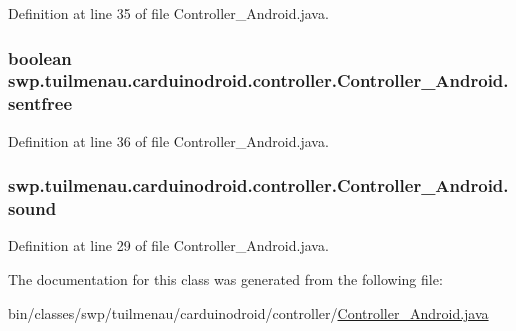 Definition at line 35 of file Controller\+\_\+\+Android.\+java.

\hypertarget{classswp_1_1tuilmenau_1_1carduinodroid_1_1controller_1_1_controller___android_a4abc4af6b59b0fdc690f69aecef0603d}{}
\subsubsection[{sentfree}]{\setlength{\rightskip}{0pt plus 5cm}boolean swp.\+tuilmenau.\+carduinodroid.\+controller.\+Controller\+\_\+\+Android.\+sentfree}\label{classswp_1_1tuilmenau_1_1carduinodroid_1_1controller_1_1_controller___android_a4abc4af6b59b0fdc690f69aecef0603d}


Definition at line 36 of file Controller\+\_\+\+Android.\+java.

\hypertarget{classswp_1_1tuilmenau_1_1carduinodroid_1_1controller_1_1_controller___android_a96379edefe6cb46ac2bd2e02312188ea}{}
\subsubsection[{sound}]{ swp.\+tuilmenau.\+carduinodroid.\+controller.\+Controller\+\_\+\+Android.\+sound}\label{classswp_1_1tuilmenau_1_1carduinodroid_1_1controller_1_1_controller___android_a96379edefe6cb46ac2bd2e02312188ea}


Definition at line 29 of file Controller\+\_\+\+Android.\+java.



The documentation for this class was generated from the following file\+:\begin{DoxyCompactItemize}
\item 
bin/classes/swp/tuilmenau/carduinodroid/controller/\hyperlink{bin_2classes_2swp_2tuilmenau_2carduinodroid_2controller_2_controller___android_8java}{Controller\+\_\+\+Android.\+java}\end{DoxyCompactItemize}
